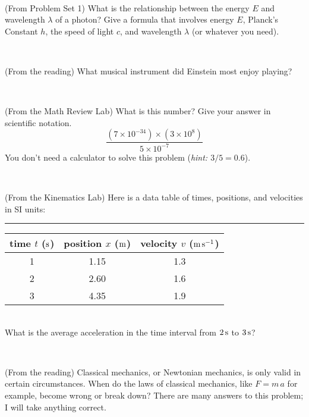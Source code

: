 \documentclass[12pt, letterpaper]{article}
\begin{document}
\vfill ~

\begin{problem} (From Problem Set 1)
What is the relationship between the energy $E$ and wavelength
$\lambda$ of a photon? Give a formula that involves energy $E$,
Planck's Constant $h$, the speed of light $c$, and wavelength
$\lambda$ (or whatever you need).
\end{problem}

\vfill ~


\clearpage


\begin{problem} (From the reading)
What musical instrument did Einstein most enjoy playing?
\end{problem}


\vfill ~

\begin{problem} (From the Math Review Lab)
What is this number? Give your answer in scientific notation.
$$
\frac{(7\times10^{-34})\times(3\times10^8)}{5\times10^{-7}}
$$
You don't need a calculator to solve this problem (\textit{hint: $3/5=0.6$}).
\end{problem}


\vfill ~

\begin{problem} (From the Kinematics Lab)
Here is a data table of times, positions, and velocities in SI units:\\
\rule{1.0in}{0pt}\begin{tabular}{c|c|c}
time $t$ ($\mathrm{s}$) & position $x$ ($\mathrm{m}$) & velocity $v$ ($\mathrm{m}\,\mathrm{s}^{-1}$) \\
\hline
1 & 1.15 & 1.3 \\
2 & 2.60 & 1.6 \\
3 & 4.35 & 1.9 \\
\hline
\end{tabular}\\
What is the average acceleration in the time interval from $2\,\mathrm{s}$ to $3\,\mathrm{s}$?
\end{problem}


\vfill ~

\begin{problem} (From the reading)
Classical mechanics, or Newtonian mechanics, is only valid in certain
circumstances. When do the laws of classical mechanics, like $F =
m\,a$ for example, become wrong or break down? There are many answers
to this problem; I will take anything correct.
\end{problem}


\vfill ~
\end{document}
